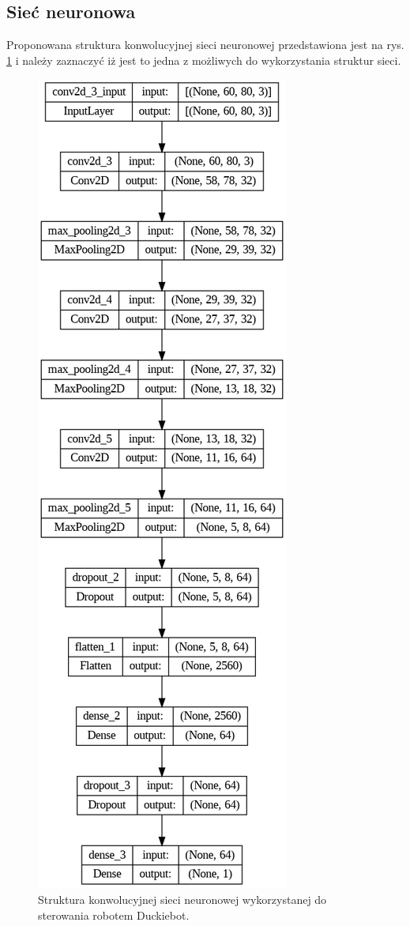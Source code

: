 \documentclass[conference]{IEEEtran}
\begin{document}
\subsection{Sieć neuronowa}
Proponowana struktura konwolucyjnej sieci neuronowej przedstawiona jest na rys. \ref{fig:cnn-structure} i należy zaznaczyć iż jest to jedna z możliwych do wykorzystania struktur sieci.

\begin{figure}[h]
    \centering
    \includegraphics[width=.5\columnwidth]{cnn2}
    \caption{Struktura konwolucyjnej sieci neuronowej wykorzystanej do sterowania robotem Duckiebot.}
    \label{fig:cnn-structure}
\end{figure}
\end{document}
